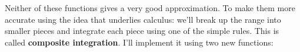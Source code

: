 \begin{Shaded}
\begin{Highlighting}[]
\StringTok{ }
  \StringTok{ }\StringTok{ }\StringTok{ }\StringTok{ }\NormalTok{)}
\NormalTok{\}}

\StringTok{ }
  \StringTok{ }\StringTok{ } \NormalTok{*}\StringTok{ }\NormalTok{(}\StringTok{ }
\NormalTok{\}}

\end{Highlighting}
\end{Shaded}

Neither of these functions gives a very good approximation. To make them
more accurate using the idea that underlies calculus: we'll break up the
range into smaller pieces and integrate each piece using one of the
simple rules. This is called \textbf{composite integration}. I'll
implement it using two new functions:

